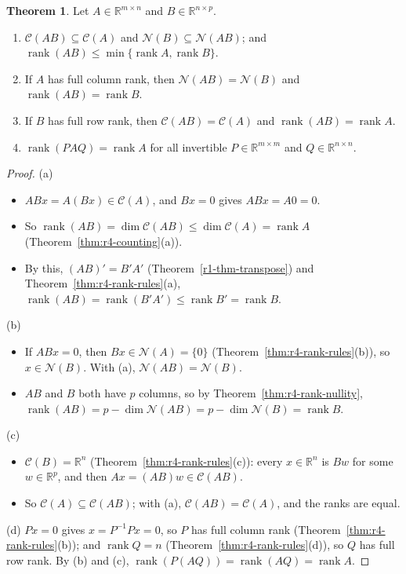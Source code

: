 \documentclass[12pt]{article}
\newcommand{\R}{\mathbb R}
\DeclareMathOperator{\rank}{rank}
\theoremstyle{definition}
\newtheorem{theorem}{Theorem}
\begin{document}
\begin{theorem}\label{thm:r4-rank-product}
Let \(A\in\R^{m\times n}\) and \(B\in\R^{n\times p}\).
\begin{enumerate}
\item \(\mathcal C(AB)\subseteq\mathcal C(A)\) and \(\mathcal N(B)\subseteq\mathcal N(AB)\); and
\(\rank(AB)\leqslant\min\{\rank A,\rank B\}\).
\item If \(A\) has full column rank, then \(\mathcal N(AB)=\mathcal N(B)\) and \(\rank(AB)=\rank B\).
\item If \(B\) has full row rank, then \(\mathcal C(AB)=\mathcal C(A)\) and \(\rank(AB)=\rank A\).
\item \(\rank(PAQ)=\rank A\) for all invertible \(P\in\R^{m\times m}\) and \(Q\in\R^{n\times n}\).
\end{enumerate}
\end{theorem}
\begin{proof}
(a)
\begin{itemize}
\item \(ABx=A(Bx)\in\mathcal C(A)\), and \(Bx=0\) gives \(ABx=A0=0\).
\item So \(\rank(AB)=\dim\mathcal C(AB)\leqslant\dim\mathcal C(A)=\rank A\)
(Theorem~\ref{thm:r4-counting}(a)).
\item By this, \((AB)'=B'A'\) (Theorem~\ref{r1-thm-transpose}) and Theorem~\ref{thm:r4-rank-rules}(a),
\(\rank(AB)=\rank(B'A')\leqslant\rank B'=\rank B\).
\end{itemize}
(b)
\begin{itemize}
\item If \(ABx=0\), then \(Bx\in\mathcal N(A)=\{0\}\) (Theorem~\ref{thm:r4-rank-rules}(b)), so
\(x\in\mathcal N(B)\). With (a), \(\mathcal N(AB)=\mathcal N(B)\).
\item \(AB\) and \(B\) both have \(p\) columns, so by Theorem~\ref{thm:r4-rank-nullity},
\(\rank(AB)=p-\dim\mathcal N(AB)=p-\dim\mathcal N(B)=\rank B\).
\end{itemize}
(c)
\begin{itemize}
\item \(\mathcal C(B)=\R^n\) (Theorem~\ref{thm:r4-rank-rules}(c)): every \(x\in\R^n\) is \(Bw\) for
some \(w\in\R^p\), and then \(Ax=(AB)w\in\mathcal C(AB)\).
\item So \(\mathcal C(A)\subseteq\mathcal C(AB)\); with (a), \(\mathcal C(AB)=\mathcal C(A)\), and the
ranks are equal.
\end{itemize}
(d) \(Px=0\) gives \(x=P^{-1}Px=0\), so \(P\) has full column rank
(Theorem~\ref{thm:r4-rank-rules}(b)); and \(\rank Q=n\) (Theorem~\ref{thm:r4-rank-rules}(d)), so
\(Q\) has full row rank. By (b) and (c), \(\rank(P(AQ))=\rank(AQ)=\rank A\).
\end{proof}
\end{document}
